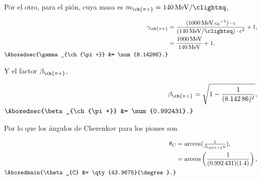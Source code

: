 \documentclass[./../main.tex]{subfiles}
\begin{document}
\begin{exercise}
\begin{solution}
			Por el otro, para el pión, cuya masa es \(m_{\ch{\pi+}} = \qty{140}{\MeV\per\clightsq}\),

			\begin{align*}
				\gamma_{\ch{\pi+}} &= \dfrac{(\qty{1000}{\MeV\per\clight})\cdot c}{(\qty{140}{\MeV\per\clightsq})\cdot c^{2}} + 1,\\
				&= \dfrac{\qty{1000}{\MeV}}{\qty{140}{\MeV}} + 1,\\
				\Aboxedsec{\gamma_{\ch{\pi+}} &= \num{8.14286}.}
			\end{align*}

			Y el factor \(\beta_{\ch{\pi+}}\),
			

			\begin{align*}
				\beta_{\ch{\pi+}} &= \sqrt{1 - \dfrac{1}{(\num{8.14286})^{2}}},\\
				\Aboxedsec{\beta_{\ch{\pi+}} &= \num{0.992431}.}
			\end{align*}

			Por lo que los ángulos de Cherenkov para los piones son

			\begin{align*}
				\theta_{C} &= \arccos(\tfrac{1}{\beta_{\ch{\pi+}} n}),\\
				&= \arccos\left(\dfrac{1}{(\num{0.992431})(1.4)}\right),\\
				\Aboxedmain{\theta_{C} &= \qty{43.9675}{\degree}.}
			\end{align*}
		\end{solution}
	\end{exercise}
\end{document}
